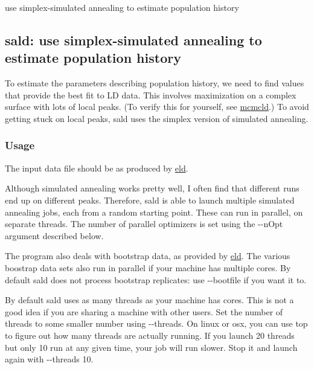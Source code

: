 use simplex-\/simulated annealing to estimate population history

\subsection*{{\ttfamily sald}\+: use simplex-\/simulated annealing to estimate population history }

To estimate the parameters describing population history, we need to find values that provide the best fit to L\+D data. This involves maximization on a complex surface with lots of local peaks. (To verify this for yourself, see \hyperlink{mcmcld}{mcmcld}.) To avoid getting stuck on local peaks, {\ttfamily sald} uses the simplex version of simulated annealing.

\subsubsection*{Usage }

The input data file should be as produced by \hyperlink{eld}{eld}.

Although simulated annealing works pretty well, I often find that different runs end up on different peaks. Therefore, {\ttfamily sald} is able to launch multiple simulated annealing jobs, each from a random starting point. These can run in parallel, on separate threads. The number of parallel optimizers is set using the {\ttfamily -\/-\/n\+Opt} argument described below.

The program also deals with bootstrap data, as provided by \hyperlink{eld}{eld}. The various boostrap data sets also run in parallel if your machine has multiple cores. By default {\ttfamily sald} does not process bootstrap replicates\+: use {\ttfamily -\/-\/bootfile} if you want it to.

By default {\ttfamily sald} uses as many threads as your machine has cores. This is not a good idea if you are sharing a machine with other users. Set the number of threads to some smaller number using {\ttfamily -\/-\/threads}. On linux or osx, you can use {\ttfamily top} to figure out how many threads are actually running. If you launch 20 threads but only 10 run at any given time, your job will run slower. Stop it and launch again with {\ttfamily -\/-\/threads 10}.

